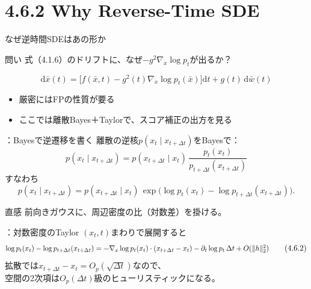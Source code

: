 \section{4.6.2 Why Reverse-Time SDE}
\asmain
\begin{frame}{なぜ逆時間SDEはあの形か}
    \begin{block}{問い}
        式（4.1.6）のドリフトに、なぜ$-g^{2}\nabla_x\log p_t$が出るか？
    \end{block}
    \[
        \mathrm{d}\bar{x}(t)
        =
        \bigl[
            f(\bar{x},t) - g^{2}(t)\nabla_x\log p_t(\bar{x})
        \bigr]\mathrm{d}t
        + g(t)\,\mathrm{d}\bar{w}(t)
        \tag{4.1.6}
    \]
    \begin{itemize}
        \item 厳密にはFPの性質が要る
        \item ここでは離散Bayes＋Taylorで、スコア補正の出方を見る
    \end{itemize}
\end{frame}
\assuppl
\begin{frame}{\supplmark：Bayesで逆遷移を書く}
    離散の逆核$p(x_t\mid x_{t+\Delta t})$をBayesで：
    \[
        p(x_t\mid x_{t+\Delta t})
        =
        p(x_{t+\Delta t}\mid x_t)\,
        \frac{p_t(x_t)}{p_{t+\Delta t}(x_{t+\Delta t})}
        \tag{4.6.1}
    \]
    すなわち
    \[
        p(x_t\mid x_{t+\Delta t})
        =
        p(x_{t+\Delta t}\mid x_t)\,
        \exp\bigl(\log p_t(x_t)-\log p_{t+\Delta t}(x_{t+\Delta t})\bigr).
    \]
    \begin{exampleblock}{直感}
        前向きガウスに、周辺密度の比（対数差）を掛ける。
    \end{exampleblock}
\end{frame}
\assuppl
\begin{frame}{\supplmark：対数密度のTaylor}
    $(x_t,t)$まわりで展開すると
    \[
        \resizebox{0.98\textwidth}{!}{$
        \log p_t(x_t)-\log p_{t+\Delta t}(x_{t+\Delta t})
        =
        -\nabla_x\log p_t(x_t)\cdot(x_{t+\Delta t}-x_t)
        -\partial_t\log p_t\,\Delta t
        + O(\|h\|_{2}^{2})
        $}
        \tag{4.6.2}
    \]
    拡散では$x_{t+\Delta t}-x_t=O_p(\sqrt{\Delta t})$なので、\\
    空間の2次項は$O_p(\Delta t)$級のヒューリスティックになる。
\end{frame}
\assuppl
